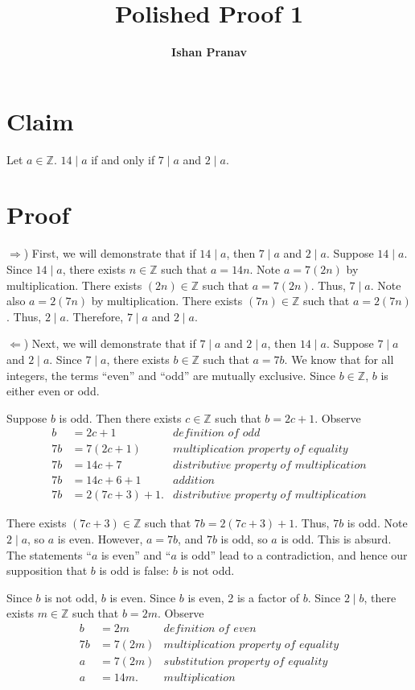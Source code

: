 \documentclass[9pt]{article}
\title{Polished Proof 1}
\author{\textbf{Ishan Pranav}}
\begin{document}
\maketitle
\section*{Claim}
Let $a\in \mathbb{Z}$. $14\mid a$ if and only if $7\mid a$ and $2\mid a$.
\section*{Proof}
$\Rightarrow$) First, we will demonstrate that if $14\mid a$, then $7\mid a$ and $2\mid a$. Suppose $14\mid a$. Since $14\mid a$, there exists $n\in\mathbb{Z}$ such that $a=14n$. Note $a=7(2n)$ by multiplication. There exists $(2n)\in\mathbb{Z}$ such that $a=7(2n)$. Thus, $7\mid a$. Note also $a=2(7n)$ by multiplication. There exists $(7n)\in\mathbb{Z}$ such that $a=2(7n)$. Thus, $2\mid a$. Therefore, $7\mid a$ and $2\mid a$.
\newline

\noindent$\Leftarrow$) Next, we will demonstrate that if $7\mid a$ and $2\mid a$, then $14\mid a$. Suppose $7\mid a$ and $2\mid a$. Since $7\mid a$, there exists $b\in\mathbb{Z}$ such that $a=7b$. We know that for all integers, the terms ``even'' and ``odd'' are mutually exclusive. Since $b\in\mathbb{Z}$, $b$ is either even or odd.

Suppose $b$ is odd. Then there exists $c\in\mathbb{Z}$ such that $b=2c+1$. Observe
\begin{align*}
b&=2c+1&\textit{definition of odd}\\
7b&=7(2c+1)&\textit{multiplication property of equality}\\
7b&=14c+7&\textit{distributive property of multiplication}\\
7b&=14c+6+1&\textit{addition}\\
7b&=2(7c+3)+1.&\textit{distributive property of multiplication}
\end{align*}

There exists $(7c+3)\in\mathbb{Z}$ such that $7b=2(7c+3)+1$. Thus, $7b$ is odd. Note $2\mid a$, so $a$ is even. However, $a=7b$, and $7b$ is odd, so $a$ is odd. This is absurd. The statements ``$a$ is even'' and ``$a$ is odd'' lead to a contradiction, and hence our supposition that $b$ is odd is false: $b$ is not odd.

Since $b$ is not odd, $b$ is even. Since $b$ is even, 2 is a factor of $b$. Since $2\mid b$, there exists $m\in\mathbb{Z}$ such that $b=2m$. Observe
\begin{align*}
b&=2m&\textit{definition of even}\\
7b&=7(2m)&\textit{multiplication property of equality}\\
a&=7(2m)&\textit{substitution property of equality}\\
a&=14m.&\textit{multiplication}
\end{align*}
\end{document}
